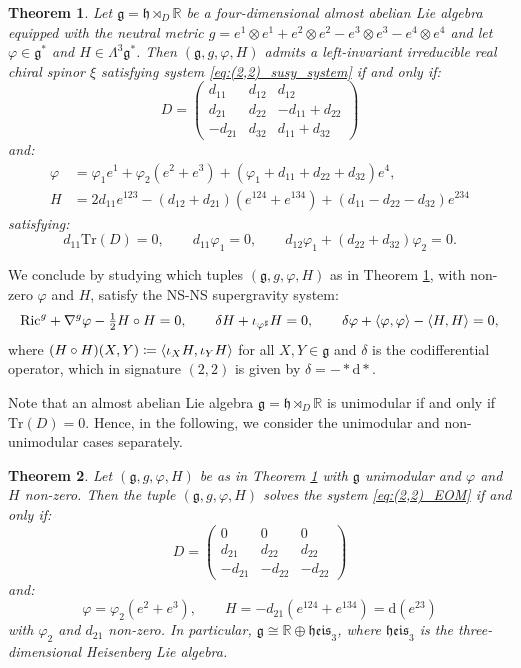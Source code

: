 \documentclass[10pt,reqno]{amsart}
\newtheorem{theorem}{Theorem}[section]
\theoremstyle{definition}
\theoremstyle{remark}
\newcommand{\R}{\mathbb{R}}
\newcommand{\Tr}{\mathrm{Tr}}
\renewcommand{\d}{\mathrm{d}}
\DeclarePairedDelimiter{\escal}{\langle}{\rangle}
\begin{document}
\begin{theorem}\label{thm:susy_(2,2)}
    Let $\mathfrak{g}=\mathfrak{h}\rtimes_D\R$ be a four-dimensional almost abelian Lie algebra equipped with the neutral metric $g=e^1\otimes e^1+e^2\otimes e^2-e^3\otimes e^3-e^4\otimes e^4$ and let $\varphi\in\mathfrak{g}^*$ and $H\in\Lambda^3\mathfrak{g}^*$. Then $(\mathfrak{g},g,\varphi,H)$ admits a left-invariant irreducible real chiral spinor $\xi$ satisfying system \eqref{eq:(2,2)_susy_system} if and only if: $$D=\begin{pmatrix}
        d_{11}&d_{12}&d_{12}\\
        d_{21}&d_{22}&-d_{11}+d_{22}\\
        -d_{21}&d_{32}&d_{11}+d_{32}
    \end{pmatrix}$$ and: \begin{align*}
        \varphi&=\varphi_1e^1+\varphi_2(e^2+e^3)+(\varphi_1+d_{11}+d_{22}+d_{32})e^4,\\
        H&=2d_{11}e^{123}-(d_{12}+d_{21})(e^{124}+e^{134})+(d_{11}-d_{22}-d_{32})e^{234}
    \end{align*} satisfying: $$d_{11}\Tr(D)=0,\qquad d_{11}\varphi_1=0,\qquad d_{12}\varphi_1+(d_{22}+d_{32})\varphi_2=0.$$
\end{theorem}

We conclude by studying which tuples $(\mathfrak{g},g,\varphi,H)$ as in Theorem \ref{thm:susy_(2,2)}, with non-zero $\varphi$ and $H$, satisfy the NS-NS supergravity system: \begin{equation}\label{eq:(2,2)_EOM}
    \mathrm{Ric}^g+\nabla^g\varphi-\tfrac{1}{2}H\circ H=0,\qquad\delta H+\iota_{\varphi^{\sharp}}H=0,\qquad\delta\varphi+\escal{\varphi,\varphi}-\escal{H,H}=0,
\end{equation} where $(H\circ H)(X,Y)\coloneqq\escal{\iota_XH,\iota_YH}$ for all $X,Y\in\mathfrak{g}$ and $\delta$ is the codifferential operator, which in signature $(2,2)$ is given by $\delta=-*\d*$.\medskip

Note that an almost abelian Lie algebra $\mathfrak{g}=\mathfrak{h}\rtimes_D\R$ is unimodular if and only if $\Tr(D)=0$. Hence, in the following, we consider the unimodular and non-unimodular cases separately.

\begin{theorem}\label{thm:EOM_(2,2)_unimodular}
    Let $(\mathfrak{g},g,\varphi,H)$ be as in Theorem \ref{thm:susy_(2,2)} with $\mathfrak{g}$ unimodular and $\varphi$ and $H$ non-zero. Then the tuple $(\mathfrak{g},g,\varphi,H)$ solves the system \eqref{eq:(2,2)_EOM} if and only if: $$D=\begin{pmatrix}
        0&0&0\\
        d_{21}&d_{22}&d_{22}\\
        -d_{21}&-d_{22}&-d_{22}
    \end{pmatrix}$$ and: $$\varphi=\varphi_2(e^2+e^3),\qquad H=-d_{21}(e^{124}+e^{134})=\d(e^{23})$$ with $\varphi_2$ and $d_{21}$ non-zero. In particular, $\mathfrak{g}\cong\R\oplus\mathfrak{heis}_3$, where $\mathfrak{heis}_3$ is the three-dimensional Heisenberg Lie algebra.
\end{theorem}
\end{document}
